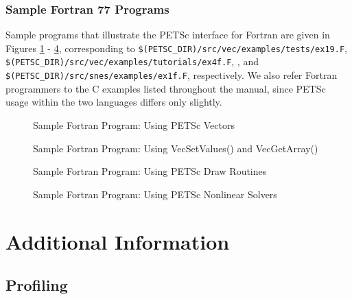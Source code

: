 \section{Sample Fortran 77 Programs}
\label{sec:fortran-examples}

Sample programs that illustrate the PETSc interface for Fortran
are given in Figures \ref{fig:vec-Fortran} - \ref{fig:SNES-Fortran},
corresponding to
{\tt \$(PETSC\_DIR)/src/vec/examples/tests/ex19.F}, 
{\tt \$(PETSC\_DIR)/src/vec/examples/tutorials/ex4f.F}, 
, and 
{\tt \$(PETSC\_DIR)/src/snes/examples/ex1f.F}, respectively.  We also
refer Fortran programmers to the C examples listed throughout the manual,
since PETSc usage within the two languages differs only slightly.

\begin{figure}[H]
{\small
{}
}
\caption{Sample Fortran Program:  Using PETSc Vectors}
\label{fig:vec-Fortran}
\end{figure}

\begin{figure}[H]
{\small
{}
}
\caption{Sample Fortran Program:  Using VecSetValues() and VecGetArray()}
\label{fig:vec2-Fortran}
\end{figure}

\begin{figure}[H]
{\small
{}
}
\caption{Sample Fortran Program:  Using PETSc Draw Routines}
\label{fig:draw-Fortran}
\end{figure}

\begin{figure}[H]
{\small
{}
}
\caption{Sample Fortran Program:  Using PETSc Nonlinear Solvers}
\label{fig:SNES-Fortran}
\end{figure}

\part{Additional Information}
\label{part:usefulstuff}

\chapter{Profiling} 
\label{ch:profiling} 

